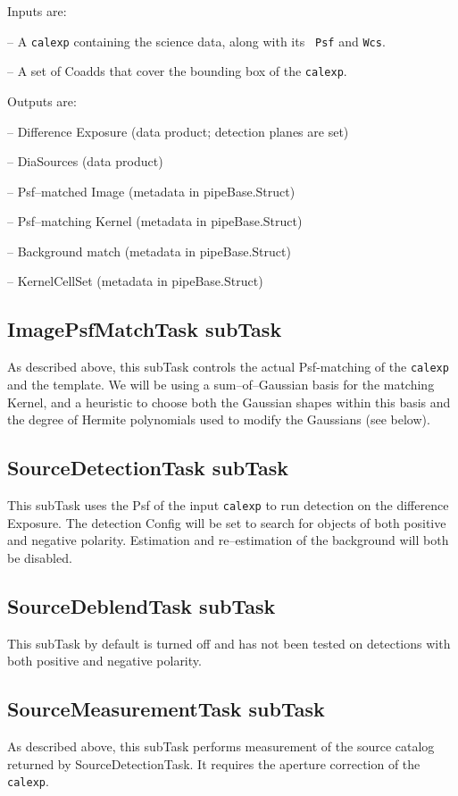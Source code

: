\documentclass[prd, nofootinbib, floatfix, 11pt,tightenlines,times]{article}
\begin{document}
Inputs are:

-- A {\tt calexp} containing the science data, along with its {\tt
  Psf} and {\tt Wcs}.

-- A set of Coadds that cover the bounding box of the {\tt calexp}.

Outputs are:

-- Difference Exposure (data product; detection planes are set)

-- DiaSources (data product)

-- Psf--matched Image (metadata in pipeBase.Struct)

-- Psf--matching Kernel (metadata in pipeBase.Struct)

-- Background match (metadata in pipeBase.Struct)

-- KernelCellSet (metadata in pipeBase.Struct)

\subsection{ImagePsfMatchTask subTask}
As described above, this subTask controls the actual Psf-matching of
the {\tt calexp} and the template.  We will be using a
sum--of--Gaussian basis for the matching Kernel, and a heuristic to
choose both the Gaussian shapes within this basis and the degree of
Hermite polynomials used to modify the Gaussians (see below).


\subsection{SourceDetectionTask subTask}
This subTask uses the Psf of the input {\tt calexp} to run detection
on the difference Exposure.  The detection Config will be set to
search for objects of both positive and negative polarity.  Estimation
and re--estimation of the background will both be disabled.

\subsection{SourceDeblendTask subTask}
This subTask by default is turned off and has not been tested on detections
with both positive and negative polarity.

\subsection{SourceMeasurementTask subTask}
As described above, this subTask performs measurement of the source
catalog returned by SourceDetectionTask.  It requires the aperture
correction of the {\tt calexp}.
\end{document}

